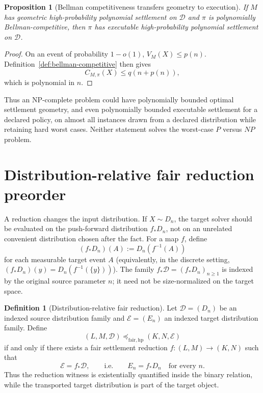 \documentclass[11pt]{article}
\newtheorem{proposition}[theorem]{Proposition}
\theoremstyle{definition}
\newtheorem{definition}[theorem]{Definition}
\begin{document}
\begin{proposition}[Bellman competitiveness transfers geometry to execution]\label{prop:bellman-transfer}
If $M$ has geometric high-probability polynomial settlement on $\mathcal D$ and $\pi$ is polynomially Bellman-competitive, then $\pi$ has executable high-probability polynomial settlement on $\mathcal D$.
\end{proposition}

\begin{proof}
On an event of probability $1-o(1)$, $V_M(X)\le p(n)$. Definition~\ref{def:bellman-competitive} then gives
\[
C_{M,\pi}(X)\le q(n+p(n)),
\]
which is polynomial in $n$.
\end{proof}

Thus an NP-complete problem could have polynomially bounded optimal settlement geometry, and even polynomially bounded executable settlement for a declared policy, on almost all instances drawn from a declared distribution while retaining hard worst cases. Neither statement solves the worst-case $P$ versus $NP$ problem.

\section{Distribution-relative fair reduction preorder}
A reduction changes the input distribution. If $X\sim D_n$, the target solver should be evaluated on the push-forward distribution $f_*D_n$, not on an unrelated convenient distribution chosen after the fact. For a map $f$, define
\[
(f_*D_n)(A):=D_n(f^{-1}(A))
\]
for each measurable target event $A$ (equivalently, in the discrete setting, $(f_*D_n)(y)=D_n(f^{-1}(\{y\}))$). The family $f_*\mathcal D=(f_*D_n)_{n\ge1}$ is indexed by the original source parameter $n$; it need not be size-normalized on the target space.

\begin{definition}[Distribution-relative fair reduction]\label{def:distribution-relative-fair}
Let $\mathcal D=(D_n)$ be an indexed source distribution family and $\mathcal E=(E_n)$ an indexed target distribution family. Define
\[
(L,M,\mathcal D)\preceq_{\mathrm{fair,hp}}(K,N,\mathcal E)
\]
if and only if there exists a fair settlement reduction $f:(L,M)\to(K,N)$ such that
\[
\mathcal E=f_*\mathcal D,
\qquad\text{i.e.}\qquad
E_n=f_*D_n\quad\text{for every }n.
\]
Thus the reduction witness is existentially quantified inside the binary relation, while the transported target distribution is part of the target object.
\end{definition}
\end{document}
